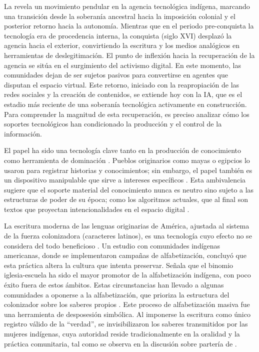 \documentclass[spanish]{textolivre}
\begin{document}
La  revela un movimiento pendular en la agencia tecnológica indígena, marcando una transición desde la soberanía ancestral hacia la imposición colonial y el posterior retorno hacia la autonomía. Mientras que en el periodo pre-conquista la tecnología era de procedencia interna, la conquista (siglo XVI) desplazó la agencia hacia el exterior, convirtiendo la escritura y los medios analógicos en herramientas de deslegitimación. El punto de inflexión hacia la recuperación de la agencia se sitúa en el surgimiento del activismo digital. En este momento, las comunidades dejan de ser sujetos pasivos para convertirse en agentes que disputan el espacio virtual. Este retorno, iniciado con la reapropiación de las redes sociales y la creación de contenidos, se extiende hoy con la IA, que es el estadio más reciente de una soberanía tecnológica activamente en construcción. Para comprender la magnitud de esta recuperación, es preciso analizar cómo los soportes tecnológicos han condicionado la producción y el control de la información.

El papel ha sido una tecnología clave tanto en la producción de conocimiento \cite{Lenoir1998} como herramienta de dominación \cite{Day2006}. Pueblos originarios como mayas o egipcios lo usaron para registrar historias y conocimientos; sin embargo, el papel también es un dispositivo manipulable que sirve a intereses específicos \cite{Chemla2005,Holmes2003}. Esta ambivalencia sugiere que el soporte material del conocimiento nunca es neutro sino sujeto a las estructuras de poder de su época; como los algoritmos actuales, que al final son textos que proyectan intencionalidades en el espacio digital \cite{Araujo2025}.

La escritura moderna de las lenguas originarias de América, ajustada al sistema de la fuerza colonizadora (caracteres latinos), es una tecnología cuyo efecto no se considera del todo beneficioso \cite{GarcesVelasquez2020,LlanesOrtiz2023}. Un estudio con comunidades indígenas americanas, donde se implementaron campañas de alfabetización, concluyó que esta práctica altera la cultura que intenta preservar. Señala que el binomio iglesia-escuela ha sido el mayor promotor de la alfabetización indígena, con poco éxito fuera de estos ámbitos. Estas circunstancias han llevado a algunas comunidades a oponerse a la alfabetización, que prioriza la estructura del colonizador sobre los saberes propios \cite{Bielenberg1999}. Este proceso de alfabetización masiva fue una herramienta de desposesión simbólica. Al imponerse la escritura como único registro válido de la “verdad”, se invisibilizaron los saberes transmitidos por las mujeres indígenas, cuya autoridad reside tradicionalmente en la oralidad y la práctica comunitaria, tal como se observa en la discusión sobre partería de \textcite{Janetsky2022}.
\end{document}
